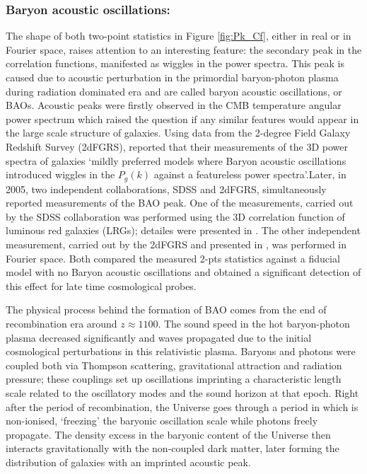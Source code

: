 \subsubsection{Baryon acoustic oscillations:}
The shape of both two-point statistics in Figure \ref{fig:Pk_Cf}, either in real or in Fourier space, raises attention to an interesting feature: the secondary peak in the correlation functions, manifested as wiggles in the power spectra. This peak is caused due to acoustic perturbation in the primordial baryon-photon plasma during radiation dominated era and are called baryon acoustic oscillations, or BAOs. Acoustic peaks were firstly observed in the CMB temperature angular power spectrum which raised the question if any similar features would appear in the large scale structure of galaxies. Using data from the 2-degree Field Galaxy Redshift Survey (2dFGRS), \cite{2001Percival} reported that their measurements of the 3D power spectra of galaxies `mildly preferred models where Baryon acoustic oscillations introduced wiggles in the $P_g(k)$ against a featureless power spectra'.Later, in 2005, two independent collaborations, SDSS and 2dFGRS, simultaneously reported measurements of the BAO peak. One of the measurements, carried out by the SDSS collaboration was performed using the 3D correlation function of luminous red galaxies (LRGs); detailes were presented in \cite{Einsenstein2005}. The other independent measurement, carried out by the 2dFGRS and presented in \cite{2005Cole-2dF}, was performed in Fourier space. Both compared the measured 2-pts statistics against a fiducial model with no Baryon acoustic oscillations and obtained a significant detection of this effect for late time cosmological probes.

\qquad The physical process behind the formation of BAO comes from the end of recombination era around $z \approx 1100$. The sound speed in the hot baryon-photon plasma decreased significantly and waves propagated due to the initial cosmological perturbations in this relativistic plasma. Baryons and photons were coupled both via Thompson scattering, gravitational attraction and radiation pressure; these couplings set up oscillations imprinting a characteristic length scale related to the oscillatory modes and the sound horizon at that epoch. Right after the period of recombination, the Universe goes through a period in which is non-ionised, `freezing' the baryonic oscillation scale while photons freely propagate. The density excess in the baryonic content of the Universe then interacts gravitationally with the non-coupled dark matter, later forming the distribution of galaxies with an imprinted acoustic peak.

